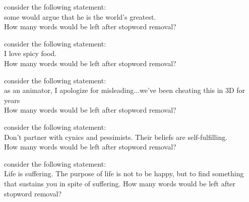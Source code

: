 \documentclass[theme=sleek, randomorder, hidesidemenu]{webquiz}
\begin{document}
\begin{question}
  consider the following statement:\\ some would argue that he is the world's greatest.\\
  How many words would be left after stopword removal?
  \begin{choice}[columns=2]
  \end{choice}
\end{question}

\begin{question}
  consider the following statement:\\
  I love spicy food.\\
  How many words would be left after stopword removal?
  \begin{choice}[columns=2]
  \end{choice}
\end{question}

\begin{question}
  consider the following statement:\\
as an animator, I apologize for misleading...we've been cheating this in 3D for years \\
  How many words would be left after stopword removal?
\end{question}

\begin{question}
  consider the following statement:\\
Don’t partner with cynics and pessimists. Their beliefs are self-fulfilling.\\
  How many words would be left after stopword removal?
  \begin{choice}[columns=2]
  \end{choice}
\end{question}

\begin{question}
  consider the following statement:\\
Life is suffering. The purpose of life is not to be happy, but to find something that sustains you in spite of suffering.
  How many words would be left after stopword removal?
\end{question}
\end{document}
